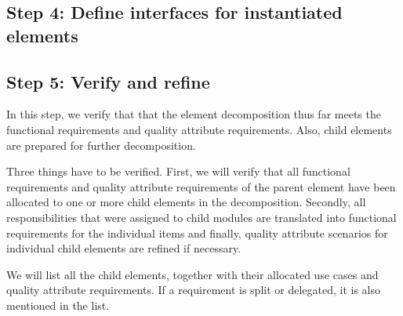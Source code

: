 \subsection{Step 4: Define interfaces for instantiated elements}
\label{add:it1/interfaces}



\subsection{Step 5: Verify and refine}
\label{add:it1/verification}

\npar In this step, we verify that that the element decomposition thus far meets
the functional requirements and quality attribute requirements. Also, child
elements are prepared for further decomposition.

\npar Three things have to be verified. First, we will verify that all
functional requirements and quality attribute requirements of the parent element
have been allocated to one or more child elements in the decomposition.
Secondly, all responsibilities that were assigned to child modules are
translated into functional requirements for the individual items and finally,
quality attribute scenarios for individual child elements are refined if
necessary.

\npar We will list all the child elements, together with their allocated use
cases and quality attribute requirements. If a requirement is split or
delegated, it is also mentioned in the list. 


